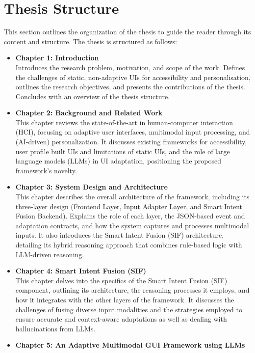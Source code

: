 \documentclass[openany]{book}
\begin{document}
\section{Thesis Structure}
This section outlines the organization of the thesis to guide the reader through its content and structure.
The thesis is structured as follows:
\begin{itemize}
     \item \textbf{Chapter 1: Introduction} \\
    Introduces the research problem, motivation, and scope of the work. Defines the challenges of static, non-adaptive UIs for accessibility and personalisation, outlines the research objectives, and presents the contributions of the thesis. Concludes with an overview of the thesis structure.
    \item \textbf{Chapter 2: Background and Related Work} \\
    This chapter reviews the state-of-the-art in human-computer interaction (HCI), focusing on adaptive user interfaces, multimodal input processing, and (AI-driven) personalization. It discusses existing frameworks for accessibility, user profile built UIs and limitations of static UIs, and the role of large language models (LLMs) in UI adaptation, positioning the proposed framework’s novelty.
    \item \textbf{Chapter 3: System Design and Architecture} \\
    This chapter describes the overall architecture of the framework, including its three-layer design (Frontend Layer, Input Adapter Layer, and Smart Intent Fusion Backend). Explains the role of each layer, the JSON-based event and adaptation contracts, and how the system captures and processes multimodal inputs. It also introduces the Smart Intent Fusion (SIF) architecture, detailing its hybrid reasoning approach that combines rule-based logic with LLM-driven reasoning.
    \item \textbf{Chapter 4: Smart Intent Fusion (SIF)} \\
    This chapter delves into the specifics of the Smart Intent Fusion (SIF) component, outlining its architecture, the reasoning processes it employs, and how it integrates with the other layers of the framework. It discusses the challenges of fusing diverse input modalities and the strategies employed to ensure accurate and context-aware adaptations as well as dealing with hallucinations from LLMs.
    \item \textbf{Chapter 5: An Adaptive Multimodal GUI Framework using LLMs} \\

\end{itemize}
\end{document}
